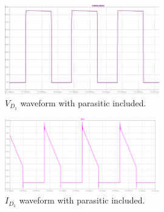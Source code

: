 \begin{figure}[H]
    \centering
    \includegraphics[width=0.6\textwidth]{Figures/diode-voltage.png}
    \caption{$V_{D_1}$ waveform with parasitic included.}
    \label{fig:v_d}
\end{figure}
\begin{figure}[H]
    \centering
    \includegraphics[width=0.6\textwidth]{Figures/diode-current.png}
    \caption{$I_{D_1}$ waveform with parasitic included.}
    \label{fig:i_d}
\end{figure}